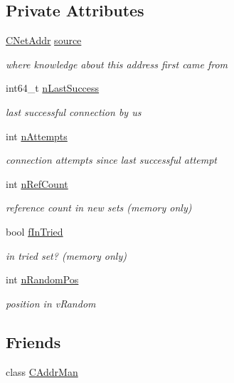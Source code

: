 \subsection*{Private Attributes}
\begin{DoxyCompactItemize}
\item 
\mbox{\hyperlink{class_c_net_addr}{C\+Net\+Addr}} \mbox{\hyperlink{class_c_addr_info_adf38b9b84f6e9ec5f16bc265c5fcd2dd}{source}}
\begin{DoxyCompactList}\small\item\em where knowledge about this address first came from \end{DoxyCompactList}\item 
int64\+\_\+t \mbox{\hyperlink{class_c_addr_info_a2d064dfb61b2c0ac1e220c8b11962efb}{n\+Last\+Success}}
\begin{DoxyCompactList}\small\item\em last successful connection by us \end{DoxyCompactList}\item 
int \mbox{\hyperlink{class_c_addr_info_a29f143837182a06bccbca363130d8e78}{n\+Attempts}}
\begin{DoxyCompactList}\small\item\em connection attempts since last successful attempt \end{DoxyCompactList}\item 
int \mbox{\hyperlink{class_c_addr_info_ada2f8362fe6ed379a6fdaa3aef682e45}{n\+Ref\+Count}}
\begin{DoxyCompactList}\small\item\em reference count in new sets (memory only) \end{DoxyCompactList}\item 
bool \mbox{\hyperlink{class_c_addr_info_a7fe19a664819fa36ef549c06a5fe0fda}{f\+In\+Tried}}
\begin{DoxyCompactList}\small\item\em in tried set? (memory only) \end{DoxyCompactList}\item 
int \mbox{\hyperlink{class_c_addr_info_a72a78ef782aae72a5a58fd4422cd8066}{n\+Random\+Pos}}
\begin{DoxyCompactList}\small\item\em position in v\+Random \end{DoxyCompactList}\end{DoxyCompactItemize}
\subsection*{Friends}
\begin{DoxyCompactItemize}
\item 
class \mbox{\hyperlink{class_c_addr_info_a17ec4e9e560da58786d2ca36092bf83d}{C\+Addr\+Man}}
\end{DoxyCompactItemize}
